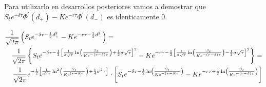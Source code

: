 \documentclass[12pt]{article}
\begin{document}
Para utilizarlo en desarrollos posteriores vamos a demostrar que $S_{t}e^{-\delta\tau}\Phi^{'}\left(d_{+}\right) - 
Ke^{-r\tau}\Phi^{'}\left(d_{-}\right)$ es identicamente $0$.
\newline

\begin{eqnarray*}
	\lefteqn{\frac{1}{\sqrt{2\pi}}\left(S_{t}e^{-\delta\tau-\frac{1}{2}d_{+}^{2}}-Ke^{-r\tau-\frac{1}{2}d_{-}^{2}}\right) =} \\
	  &  & \frac{1}{\sqrt{2\pi}}\left\{ S_{t}e^{-\delta\tau-\frac{1}{2}\left[\frac{1}{\sigma\sqrt{\tau}}\ln\left(\frac{S_{t}} 
	{Ke^{-\left(r-\delta\right)\tau}}\right)+\frac{1}{2}\sigma\sqrt{\tau}\right]^{2}} - 
	 Ke^{-r\tau-\frac{1}{2}\left[\frac{1}{\sigma\sqrt{\tau}}\ln\left(\frac{S_{t}}{Ke^{-\left(r-\delta\right)\tau}}
	\right)-\frac{1}{2}\sigma\sqrt{\tau}\right]^{2}}\right\} = \\
	  &  & \frac{1}{\sqrt{2\pi}}e^{-\frac{1}{2}\left[\frac{1}{\sigma^{2}\tau}\ln^{2}\left(\frac{S_{t}}{Ke^{\left(r-\delta\right)
	\tau}}\right) + \frac{1}{4}\sigma^{2}\tau\right]}\cdot\left[S_{t}e^{-\delta\tau-\frac{1}{2}\ln\left(\frac{S_{t}}
	{Ke^{-\left(r-\delta\right)\tau}}\right)}-
	Ke^{-r\tau+\frac{1}{2}\ln\left(\frac{S_{t}}{Ke^{-\left(r-\delta\right)\tau}}\right)}\right]
\end{eqnarray*}
\end{document}
